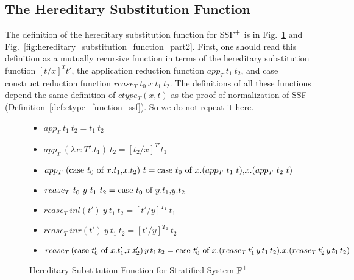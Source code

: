 \subsection{The Hereditary Substitution Function}
\label{sec:the_hereditary_substitution_function_ssfp}

The definition of the hereditary substitution function for SS$\mbox{F}^{+}$ is
in Fig.~\ref{fig:hereditary_substitution_function_part1} and
Fig.~\ref{fig:hereditary_substitution_function_part2}.  First, one
should read this definition as a mutually recursive function in terms
of the hereditary substitution function $[t/x]^T t'$, the
application reduction function $app_T\ t_1\ t_2$, and case
construct reduction function $rcase_T\ t_0\ x\ t_1\ t_2$.  The
definitions of all these functions depend the same definition of
$ctype_T(x, t)$ as the proof of normalization of SSF
(Definition~\ref{def:ctype_function_ssf}).  So we do not repeat it
here.
\begin{figure}
  \small
  \begin{itemize}
  \item[] $app_T\ t_1\ t_2 = t_1\ t_2$
    
  \item[] $app_T\ (\lambda x:T'.t_1)\ t_2 = [t_2/x]^{T'} t_1$
  \item[] $app_T\ (\mbox{case}\ t_0\ \text{of}\ x\text{.}t_1\text{,}x\text{.}t_2)\ t = 
    \mbox{case}\ t_0\ \text{of}\ x\text{.}(app_T\ t_1\ t)\text{,}x\text{.}(app_T\ t_2\ t)$
  \end{itemize}
  
  \begin{itemize}
  \item[] $rcase_{T}\ t_0\ y\ t_1\ t_2 = \mbox{case}\ t_0\ \text{of}\ y\text{.}t_1\text{,}y\text{.}t_2$
  \item[] $rcase_{T}\ inl(t')\ y\ t_1\ t_2 = [t'/y]^{T_1}\ t_1$
  \item[] $rcase_{T}\ inr(t')\ y\ t_1\ t_2 = [t'/y]^{T_2}\ t_2$
  \item[] $rcase_{T}\,(\mbox{case}\ t'_0\ \text{of}\ x\text{.}t'_1\text{,}x\text{.}t'_2)\,y\,t_1\,t_2 = 
    \mbox{case}\ t'_0\ \text{of}\ x\text{.}(rcase_{T}\,t'_1\,y\,t_1\,t_2)\text{,}x\text{.}(rcase_{T}\,t'_2\,y\,t_1\,t_2)$
  \end{itemize}
  \caption{Hereditary Substitution Function for Stratified System $\mbox{F}^{+}$}
  \label{fig:hereditary_substitution_function_part1}
\end{figure}

